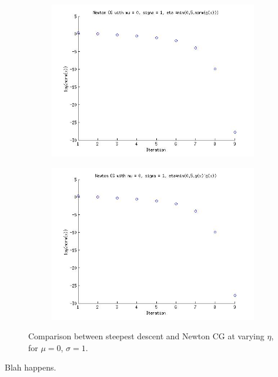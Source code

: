 \documentclass{article}
\begin{document}
\begin{figure}[!htb]
\begin{subfigure}[bh]{0.45\textwidth}
                \includegraphics[width=\textwidth]{figs/P3NCGmu0sig1eta2.jpg}
        \end{subfigure}%
        \begin{subfigure}[bh]{0.45\textwidth}
                \includegraphics[width=\textwidth]{figs/P3NCGmu0sig1eta3.jpg}
        \end{subfigure}
        \caption{Comparison between steepest descent and Newton CG at
 varying $\eta$, for $\mu=0$, $\sigma=1$.}
\end{figure}
Blah happens.
\end{document}
